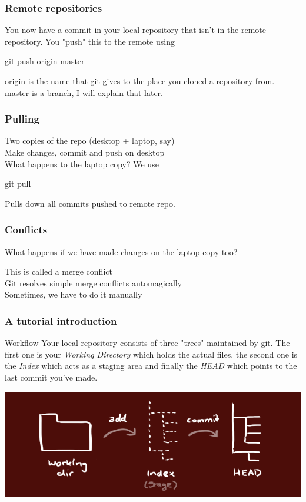 \documentclass[xcolor=dvipsnames]{beamer}
\begin{document}
\begin{frame}
    \frametitle{Remote repositories}

    You now have a commit in your local repository that isn't in the remote repository.
    You "push" this to the remote using
    \begin{block}{}
        git push origin master
    \end{block}
    
    origin is the name that git gives to the place you cloned a repository from.\\
    master is a branch, I will explain that later.

\end{frame}

\begin{frame}
    \frametitle{Pulling}

    Two copies of the repo (desktop + laptop, say)\\
    Make changes, commit and push on desktop\\\vbox{}
    What happens to the laptop copy? We use
    \begin{block}
        git pull
    \end{block}
    Pulls down all commits pushed to remote repo.
\end{frame}

\begin{frame}
    \frametitle{Conflicts}

    What happens if we have made changes on the laptop copy too?\\\vbox{}
    
    This is called a merge conflict\\
    Git resolves simple merge conflicts automagically\\
    Sometimes, we have to do it manually\\
\end{frame}

\begin{frame}
    \frametitle{A tutorial introduction}

    \begin{block}{Workflow}
        Your local repository consists of three "trees" maintained by git. The first one is 
        your \emph{Working Directory} which holds the actual files. the second one is the \emph{Index} which acts as a staging area and finally the \emph{HEAD} which points to the last commit you've made.
    \end{block}
    \begin{center}
        \includegraphics[scale=0.3]{trees.png}
    \end{center}
\end{frame}
\end{document}
